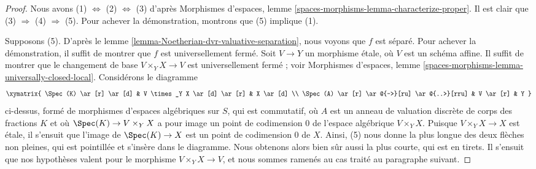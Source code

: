 \begin{proof}
Nous avons (1) $\Leftrightarrow$ (2) $\Leftrightarrow$ (3) d'après 
Morphismes d'espaces, lemme \ref{spaces-morphisms-lemma-characterize-proper}.
Il est clair que (3) $\Rightarrow$ (4) $\Rightarrow$ (5).
Pour achever la démonstration, montrons que (5) implique (1).

\medskip\noindent
Supposons (5). D'après le lemme \ref{lemma-Noetherian-dvr-valuative-separation},
nous voyons que $f$ est séparé. Pour achever la démonstration, il suffit de montrer
que $f$ est universellement fermé. Soit $V \to Y$ un morphisme \'etale,
où $V$ est un schéma affine. Il suffit de montrer que le changement de
base $V \times_Y X \to V$ est universellement fermé ; voir
Morphismes d'espaces, lemme
\ref{spaces-morphisms-lemma-universally-closed-local}.
Considérons le diagramme
$$
\xymatrix{
\Spec(K) \ar[r] \ar[d] & V \times_Y X \ar[d] \ar[r] & X \ar[d] \\
\Spec(A) \ar[r] \ar@{-->}[ru] \ar@{..>}[rru] & V \ar[r] & Y
}
$$
ci-dessus, formé de morphismes d'espaces algébriques sur $S$,
qui est commutatif, où $A$ est un anneau de valuation discrète
de corps des fractions $K$ et où $\Spec(K) \to V \times_Y X$
a pour image un point de codimension $0$ de l'espace algébrique
$V \times_Y X$. Puisque $V \times_Y X \to X$ est \'etale, il s'ensuit
que l'image de $\Spec(K) \to X$ est un point de codimension $0$
de $X$. Ainsi, (5) nous donne la plus longue des deux flèches non pleines,
qui est pointillée et s'insère dans le diagramme. Nous obtenons alors bien sûr aussi
la plus courte, qui est en tirets. Il s'ensuit que nos hypothèses valent pour
le morphisme $V \times_Y X \to V$, et nous sommes ramenés au cas traité
au paragraphe suivant.


\end{proof}
